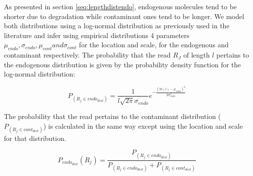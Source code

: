 \documentclass[a4paper,12pt]{article}
\begin{document}
%
%
%
%
%
%
%
%
%

As presented in section \ref{seq:lengthdistendo}, endogenous molecules tend to be shorter due to degradation while contaminant ones tend to be longer. We model both distributions using a log-normal distribution as previously used in the literature \cite{schmutzi} and infer using empirical distributions 4 parameters $\mu_{endo}, \sigma_{endo}, \mu_{cont} and \sigma_{cont}$ for the location and scale, for the endogenous and contaminant respectively. The probability that the read $R_J$ of length $l$ pertains to the endogenous distribution is given by the probability density function for the log-normal distribution:

\begin{equation}
P_(R_j \in endo_{dist}) = \frac {1} {l \sqrt{2\pi} \sigma_{endo}} e^{ - \frac{(ln(l) - \mu_{endo})^2 }  {2 \sigma_{endo}^2} } 
\end{equation}

\noindent The probability that the read pertains to the contaminant distribution ($P_(R_j \in cont_{dist})$) is calculated in the same way except using the location and scale for that distribution. 

\begin{equation}
P_{endo_{dist} }(R_j) = \frac {P_(R_j \in endo_{dist})} {P_(R_j \in endo_{dist}) + P_(R_j \in cont_{dist})}
\end{equation}
\end{document}
